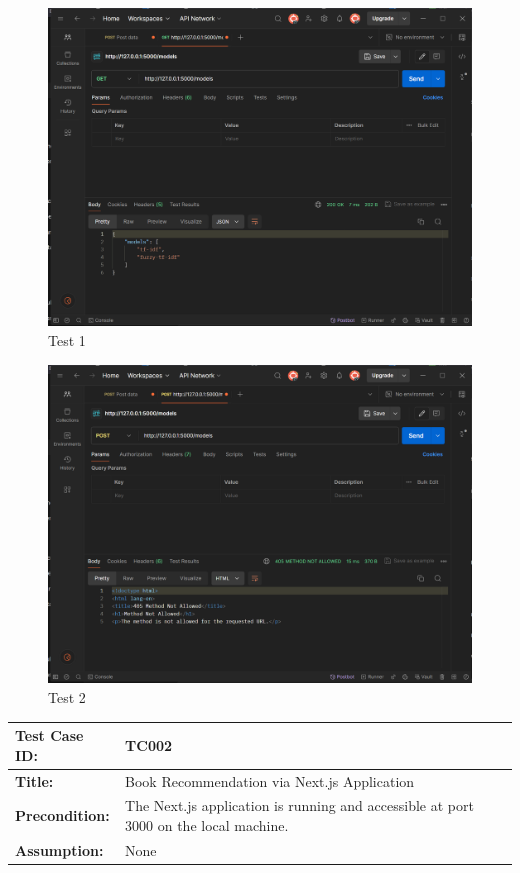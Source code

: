 \begin{figure}[htbp]
    \centering
    \includegraphics[width=1\textwidth]{../../assets/test_1_models.png}
    \caption{Test 1}
    \label{fig:test1models}
\end{figure}
\begin{figure}[htbp]
    \centering
    \includegraphics[width=1\textwidth]{../../assets/test_2_models.png}
    \caption{Test 2}
    \label{fig:test2models}
\end{figure}

\noindent
\begin{tabularx}{\textwidth}{|>{\raggedright\arraybackslash}p{4cm}|X|}
    \hline
    \textbf{Test Case ID:} & TC002 \\ \hline
    \textbf{Title:} & Book Recommendation via Next.js Application \\ \hline
    \textbf{Precondition:} & The Next.js application is running and accessible at port 3000 on the local machine. \\ \hline
    \textbf{Assumption:} & None \\ \hline
\end{tabularx}

